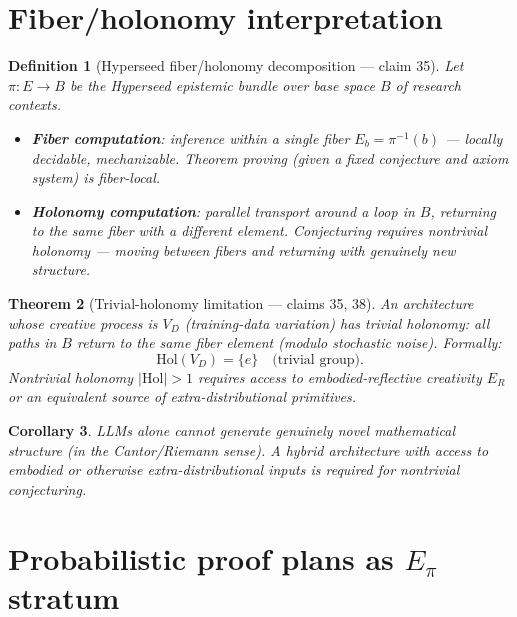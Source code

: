 \documentclass[11pt,a4paper]{article}
\newtheorem{definition}{Definition}[section]
\newtheorem{theorem}[definition]{Theorem}
\newtheorem{corollary}[definition]{Corollary}
\begin{document}
\section{Fiber/holonomy interpretation}
\label{sec:fiber-holonomy}

\begin{definition}[Hyperseed fiber/holonomy decomposition --- claim 35]
\label{def:fiber-holonomy}
Let $\pi : E \to B$ be the Hyperseed epistemic bundle over base space $B$
of research contexts.
\begin{itemize}
\item \textbf{Fiber computation}: inference within a single fiber
  $E_b = \pi^{-1}(b)$ --- locally decidable, mechanizable. Theorem
  proving (given a fixed conjecture and axiom system) is fiber-local.
\item \textbf{Holonomy computation}: parallel transport around a loop in $B$,
  returning to the same fiber with a different element. Conjecturing
  requires nontrivial holonomy --- moving between fibers and returning
  with genuinely new structure.
\end{itemize}
\end{definition}

\begin{theorem}[Trivial-holonomy limitation --- claims 35, 38]
\label{thm:trivial-holonomy}
An architecture whose creative process is $V_D$ (training-data variation)
has trivial holonomy: all paths in $B$ return to the same fiber element
(modulo stochastic noise). Formally:
\[
  \text{Hol}(V_D) = \{e\} \quad \text{(trivial group)}.
\]
Nontrivial holonomy $|\text{Hol}| > 1$ requires access to embodied-reflective
creativity $E_R$ or an equivalent source of extra-distributional primitives.
\end{theorem}

\begin{corollary}
LLMs alone cannot generate genuinely novel mathematical structure
(in the Cantor/Riemann sense). A hybrid architecture with access to
embodied or otherwise extra-distributional inputs is required for
nontrivial conjecturing.
\end{corollary}

\section{Probabilistic proof plans as $E_\pi$ stratum}
\label{sec:proof-plans}
\end{document}
